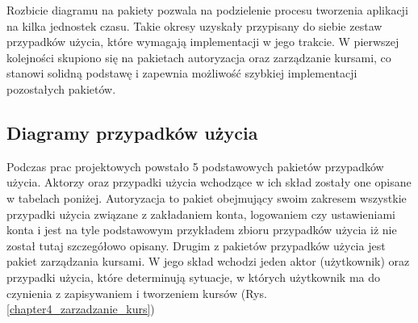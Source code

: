 Rozbicie diagramu na pakiety pozwala na podzielenie procesu tworzenia aplikacji na kilka jednostek czasu. Takie okresy uzyskały przypisany do siebie zestaw przypadków użycia, które wymagają implementacji w jego trakcie. W pierwszej kolejności skupiono się na pakietach autoryzacja oraz zarządzanie kursami, co stanowi solidną podstawę i zapewnia możliwość szybkiej implementacji pozostałych pakietów. 

\subsection{Diagramy przypadków użycia}


Podczas prac projektowych powstało 5 podstawowych pakietów przypadków użycia. Aktorzy oraz przypadki użycia wchodzące w ich skład zostały one opisane w tabelach poniżej. Autoryzacja to pakiet obejmujący swoim zakresem wszystkie przypadki użycia związane z zakładaniem konta, logowaniem czy ustawieniami konta i jest na tyle podstawowym przykładem zbioru przypadków użycia iż nie został tutaj szczegółowo opisany. Drugim z pakietów przypadków użycia jest pakiet zarządzania kursami. W jego skład wchodzi jeden aktor (użytkownik) oraz przypadki użycia, które determinują sytuacje, w których użytkownik ma do czynienia z zapisywaniem i tworzeniem kursów (Rys.  \ref{chapter4_zarzadzanie_kurs})
